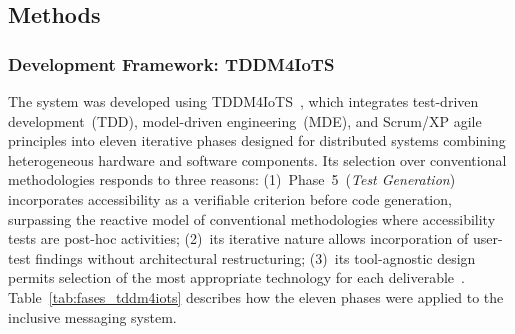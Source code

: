\documentclass[journal]{IEEEtran}
\begin{document}
	\subsection{Methods}
	
	\subsubsection{Development Framework: TDDM4IoTS}
	The system was developed using TDDM4IoTS~\cite{guerrero2020},
	which integrates test-driven development~(TDD), model-driven
	engineering~(MDE), and Scrum/XP agile principles into eleven
	iterative phases designed for distributed systems combining
	heterogeneous hardware and software components.
	Its selection over conventional methodologies responds to three
	reasons:
	(1)~Phase~5~(\textit{Test Generation}) incorporates accessibility
	as a verifiable criterion before code generation, surpassing the
	reactive model of conventional methodologies where accessibility
	tests are post-hoc activities;
	(2)~its iterative nature allows incorporation of user-test findings
	without architectural restructuring;
	(3)~its tool-agnostic design permits selection of the most
	appropriate technology for each deliverable~\cite{guerrero2020}.
	Table~\ref{tab:fases_tddm4iots} describes how the eleven phases
	were applied to the inclusive messaging system.
	
\end{document}
